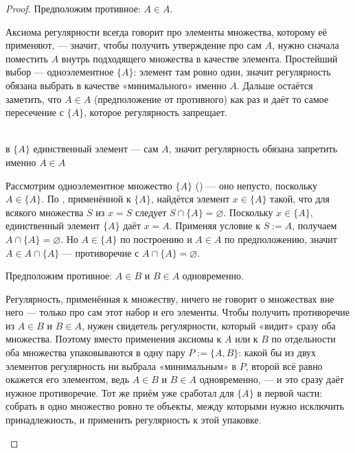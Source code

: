 \begin{proof}
Предположим противное: $A \in A$.

\begin{intuition}
Аксиома регулярности всегда говорит про элементы множества, которому её применяют, — значит,
чтобы получить утверждение про сам $A$, нужно сначала поместить $A$ внутрь подходящего
множества в качестве элемента. Простейший выбор — одноэлементное $\{A\}$: элемент там ровно
один, значит регулярность обязана выбрать в качестве «минимального» именно $A$. Дальше
остаётся заметить, что $A \in A$ (предположение от противного) как раз и даёт то самое
пересечение с $\{A\}$, которое регулярность запрещает.

\begin{center}
\\
{\footnotesize\color{intuitiongray}в $\{A\}$ единственный элемент — сам $A$, значит
регулярность обязана запретить именно $A\in A$}
\end{center}
\end{intuition}

Рассмотрим одноэлементное множество $\{A\}$
() — оно непусто, поскольку $A \in \{A\}$. По
, применённой к $\{A\}$, найдётся элемент
$x \in \{A\}$ такой, что для всякого множества $S$ из $x = S$ следует $S \cap \{A\} =
\varnothing$. Поскольку $x \in \{A\}$, единственный элемент $\{A\}$ даёт $x = A$. Применяя
условие к $S := A$, получаем $A \cap \{A\} = \varnothing$. Но $A \in \{A\}$ по построению и
$A \in A$ по предположению, значит $A \in A \cap \{A\}$ — противоречие с $A \cap \{A\} =
\varnothing$.

Предположим противное: $A \in B$ и $B \in A$ одновременно.

\begin{intuition}
Регулярность, применённая к множеству, ничего не говорит о множествах вне него — только про
сам этот набор и его элементы. Чтобы получить противоречие из $A \in B$ и $B \in A$, нужен
свидетель регулярности, который «видит» сразу оба множества. Поэтому вместо применения аксиомы
к $A$ или к $B$ по отдельности оба множества упаковываются в одну пару $P := \{A,B\}$: какой
бы из двух элементов регулярность ни выбрала «минимальным» в $P$, второй всё равно окажется
его элементом, ведь $A \in B$ и $B \in A$ одновременно, — и это сразу даёт нужное
противоречие. Тот же приём уже сработал для $\{A\}$ в первой части: собрать в одно множество
ровно те объекты, между которыми нужно исключить принадлежность, и применить регулярность к
этой упаковке.


\end{intuition}
\end{proof}
